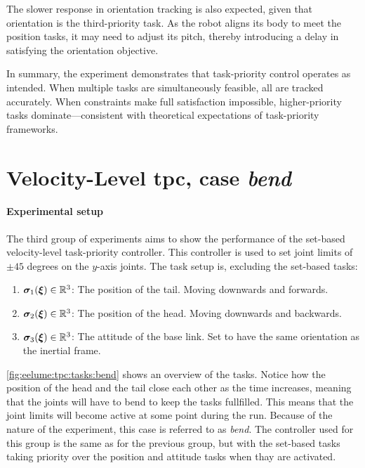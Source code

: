 The slower response in orientation tracking is also expected, given that orientation is the third-priority task. As the robot aligns its body to meet the position tasks, it may need to adjust its pitch, thereby introducing a delay in satisfying the orientation objective.

In summary, the experiment demonstrates that task-priority control operates as intended. When multiple tasks are simultaneously feasible, all are tracked accurately. When constraints make full satisfaction impossible, higher-priority tasks dominate—consistent with theoretical expectations of task-priority frameworks.


\FloatBarrier

\newpage
\section{Velocity-Level \gls{tpc}, case \textit{bend}}

\paragraph{Experimental setup}
The third group of experiments aims to show the performance of the set-based
velocity-level task-priority controller. This controller is used to set
joint limits of \(\pm 45\) degrees on the \(y\)-axis joints. The task setup is,
excluding the set-based tasks:
\begin{enumerate}
    \item \(\bm{\sigma}_1(\bm{\xi}) \in \mathbb{R}^3\): The position of the tail. Moving downwards and forwards.
    \item \(\bm{\sigma}_2(\bm{\xi}) \in \mathbb{R}^3\): The position of the head. Moving downwards and backwards.
    \item \(\bm{\sigma}_3(\bm{\xi}) \in \mathbb{R}^3\): The attitude of the base link. Set to have the same orientation as the inertial frame.
\end{enumerate}
\autoref{fig:eelume:tpc:tasks:bend} shows an overview of the tasks. Notice how
the position of the head and the tail close each other as the time increases, meaning
that the joints will have to bend to keep the tasks fullfilled. This means
that the joint limits will become active at some point during the run. Because
of the nature of the experiment, this case is referred to as \textit{bend}.
The controller
used for this group is the same as for the previous group, but with the set-based
tasks taking priority over the position and attitude tasks when thay are activated.

